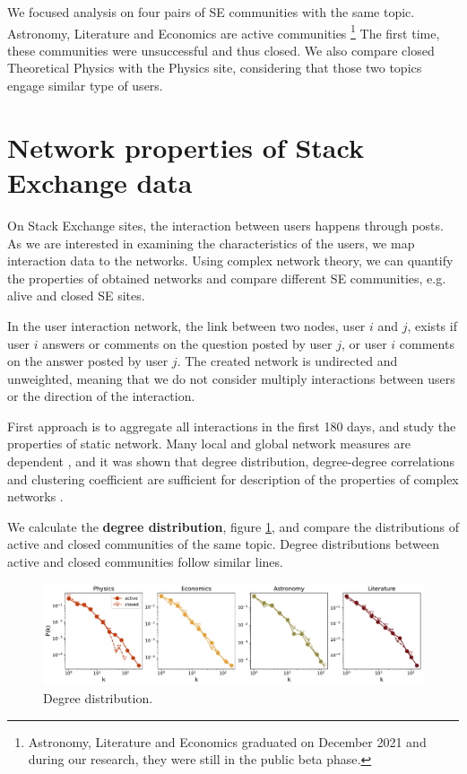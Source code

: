 We focused analysis on four pairs of SE communities with the same topic. Astronomy, Literature and Economics are active communities \footnote{Astronomy, Literature and Economics graduated on December 2021 and during our research, they were still in the public beta phase.} The first time, these communities were unsuccessful and thus closed. We also compare closed Theoretical Physics with the Physics site, considering that those two topics engage similar type of users.

\section{Network properties of Stack Exchange data}

On Stack Exchange sites, the interaction between users happens through posts. As we are interested in examining the characteristics of the users, we map interaction data to the networks. Using complex network theory, we can quantify the properties of obtained networks and compare different SE communities, e.g. alive and closed SE sites. 

In the user interaction network, the link between two nodes, user $i$ and $j$, exists if user $i$ answers or comments on the question posted by user $j$, or user $i$ comments on the answer posted by user $j$. The created network is undirected and unweighted, meaning that we do not consider multiply interactions between users or the direction of the interaction. 

First approach is to aggregate all interactions in the first 180 days, and study the properties of static network. Many local and global network measures are dependent 
\cite{boccaletti2006complex}, and it was shown that degree distribution, degree-degree correlations and clustering coefficient are sufficient for description of the properties of complex networks \cite{orsini2015quantifying}. 
 
 
We calculate the \textbf{degree distribution}, figure \ref{fig:fullnetdeg}, and compare the distributions of active and closed communities of the same topic. Degree distributions between active and closed communities follow similar lines. 
 
 \begin{figure}[h]
 	\centering
 	\includegraphics[width=\linewidth]{figures/stackexchange/degree_distribution_fullnet.pdf}
 	\caption{Degree distribution.}
 	\label{fig:fullnetdeg}
 \end{figure}
 
